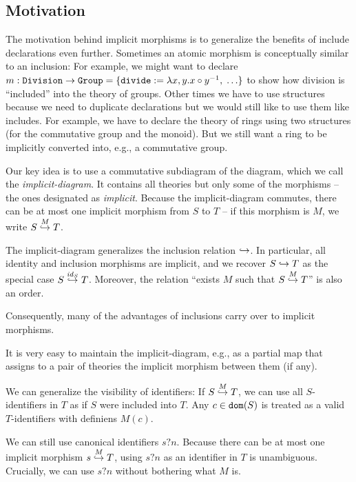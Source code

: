 \subsection{Motivation}

The motivation behind implicit morphisms is to generalize the benefits of include declarations even further.
Sometimes an atomic morphism is conceptually similar to an inclusion: For example, we might want to declare $m:\cn{Division}\to\cn{Group}=\{\cn{divide} := \lambda x,y.x\circ y^{-1}, \;\ldots\}$ to show how division is ``included'' into the theory of groups.
Other times we have to use structures because we need to duplicate declarations but we would still like to use them like includes.
For example, we have to declare the theory of rings using two structures (for the commutative group and the monoid).
But we still want a ring to be implicitly converted into, e.g., a commutative group.

Our key idea is to use a commutative{\footnotemark} subdiagram of the \mmt diagram, which we call the \emph{implicit-diagram}.
It contains all theories but only some of the morphisms -- the ones designated as \emph{implicit}.
Because the implicit-diagram commutes, there can be at most one implicit morphism from $S$ to $T$ -- if this morphism is $M$, we write $\ipc{M}{S}{T}$.

The implicit-diagram generalizes the inclusion relation $\harr$.
In particular, all identity and inclusion morphisms are implicit, and we recover $S\harr T$ as the special case $\ipc{\id{S}}{S}{T}$.
Moreover, the relation ``exists $M$ such that $\ipc{M}{S}{T}$'' is also an order.

Consequently, many of the advantages of inclusions carry over to implicit morphisms.
\begin{compactitem}
\item It is very easy to maintain the implicit-diagram, e.g., as a partial map that assigns to a pair of theories the implicit morphism between them (if any).
\item We can generalize the visibility of identifiers: If $\ipc{M}{S}{T}$, we can use all $S$-identifiers in $T$ as if $S$ were included into $T$.
Any $c\in\dom{S}$ is treated as a valid $T$-identifiers with definiens $M(c)$.
\item We can still use canonical identifiers $s?n$. Because there can be at most one implicit morphism $\ipc{M}{s}{T}$, using $s?n$ as an identifier in $T$ is unambiguous.
Crucially, we can use $s?n$ without bothering what $M$ is.
\end{compactitem}

